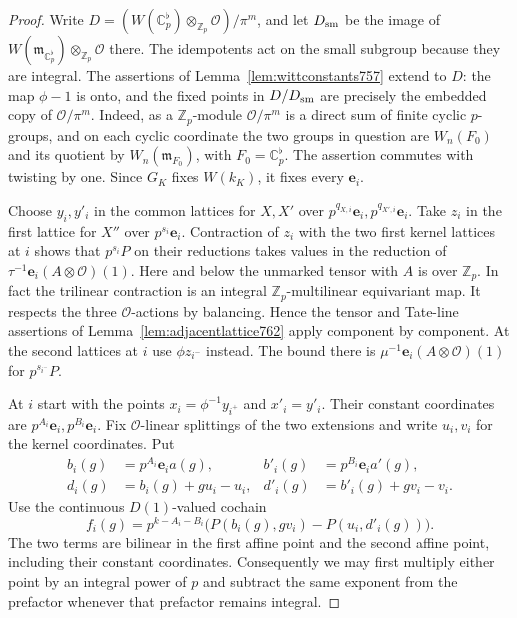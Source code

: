 \documentclass[a4paper,11pt]{article}
\theoremstyle{definition}
\theoremstyle{remark}
\newcommand{\ZZ}{\mathbb Z}\newcommand{\ord}{\operatorname{ord}}
\numberwithin{equation}{section}
\begin{document}
\begin{proof}
Write \(D=(W(\mathbb C_p^\flat)\otimes_{\ZZ_p}\mathcal O)/
\pi^m\), and let \(D_{\rm sm}\) be the image of
\(W(\mathfrak m_{\mathbb C_p^\flat})\otimes_{\ZZ_p}\mathcal O\)
there. The idempotents act on the small subgroup because
they are integral. The assertions of
Lemma~\ref{lem:wittconstants757} extend to \(D\): the map
\(\phi-1\) is onto, and the fixed points in \(D/D_{\rm sm}\)
are precisely the embedded copy of \(\mathcal O/\pi^m\).
Indeed, as a \(\ZZ_p\)-module \(\mathcal O/\pi^m\) is a direct
sum of finite cyclic \(p\)-groups, and on each cyclic
coordinate the two groups in question are \(W_n(F_0)\)
and its quotient by \(W_n(\mathfrak m_{F_0})\), with
\(F_0=\mathbb C_p^\flat\). The assertion commutes with
twisting by one. Since \(G_K\) fixes \(W(k_K)\), it fixes
every \(\mathbf e_i\).

Choose \(y_i,y'_i\) in the common lattices for \(X,X'\)
over \(p^{q_{X,i}}\mathbf e_i,p^{q_{X',i}}\mathbf e_i\).
Take \(z_i\) in the first lattice for \(X''\) over
\(p^{s_i}\mathbf e_i\). Contraction of \(z_i\) with the
two first kernel lattices at \(i\) shows that \(p^{s_i}P\)
on their reductions takes values in the reduction of
\(\tau^{-1}\mathbf e_i(A\otimes\mathcal O)(1)\). Here and
below the unmarked tensor with \(A\) is over \(\ZZ_p\).
In fact the trilinear contraction is an integral
\(\ZZ_p\)-multilinear equivariant map. It respects the
three \(\mathcal O\)-actions by balancing. Hence the
tensor and Tate-line assertions of
Lemma~\ref{lem:adjacentlattice762} apply component by
component. At the second lattices at \(i\) use
\(\phi z_{i^-}\) instead. The bound there is
\(\mu^{-1}\mathbf e_i(A\otimes\mathcal O)(1)\) for
\(p^{s_{i^-}}P\).

At \(i\) start with the points \(x_i=\phi^{-1}y_{i^+}\)
and \(x'_i=y'_i\). Their constant coordinates are
\(p^{A_i}\mathbf e_i,p^{B_i}\mathbf e_i\). Fix
\(\mathcal O\)-linear splittings of the two extensions and
write \(u_i,v_i\) for the kernel coordinates. Put
\[
 \begin{aligned}
 b_i(g)&=p^{A_i}\mathbf e_i a(g),&
 b'_i(g)&=p^{B_i}\mathbf e_i a'(g),\\
 d_i(g)&=b_i(g)+gu_i-u_i,&
 d'_i(g)&=b'_i(g)+gv_i-v_i .
 \end{aligned}
\]
Use the continuous \(D(1)\)-valued cochain
\[
 f_i(g)=p^{k-A_i-B_i}
          \big(P(b_i(g),g v_i)-P(u_i,d'_i(g))\big).
\]
The two terms are bilinear in the first affine point and
the second affine point, including their constant
coordinates. Consequently we may first multiply either
point by an integral power of \(p\) and subtract the same
exponent from the prefactor whenever that prefactor
remains integral.


\end{proof}
\end{document}
